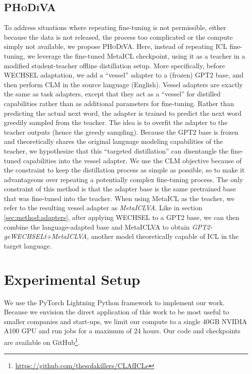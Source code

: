 \documentclass[11pt]{article}
\begin{document}
\subsection{\textsc{PHoDiVA}}

To address situations where repeating fine-tuning is not permissible, either because the data is not
released, the process too complicated or the compute simply not available, we propose
\textsc{PHoDiVA}. Here, instead of repeating ICL fine-tuning, we leverage the fine-tuned MetaICL
checkpoint, using it as a teacher in a modified student-teacher offline distillation
\citep{hinton_distilling_2015} setup. More specifically, before WECHSEL adaptation, we add
a ``vessel'' adapter to a (frozen) GPT2 base, and then perform CLM in the source language (English).
Vessel adapters are exactly the same as task adapters, except that they act as a ``vessel'' for
distilled capabilities rather than as additional parameters for fine-tuning. Rather than predicting
the actual next word, the adapter is trained to predict the next word greedily sampled from the
teacher. The idea is to overfit the adapter to the teacher outputs (hence the greedy sampling).
Because the GPT2 base is frozen and theoretically shares the original language modeling capabilities
of the teacher, we hypothesize that this ``targeted distillation'' can disentangle the fine-tuned
capabilities into the vessel adapter. We use the CLM objective because of the constraint to keep the
distillation process as simple as possible, so to make it advantageous over repeating a potentially
complex fine-tuning process. The only constraint of this method is that the adapter base is the same
pretrained base that was fine-tuned into the teacher. When using MetaICL as the teacher, we refer to
the resulting vessel adapter as \textit{MetaICLVA}. Like in section \ref{sec:method:adapters}, after
applying WECHSEL to a GPT2 base, we can then combine the language-adapted base and MetaICLVA to
obtain \textit{GPT2-geWECHSELt+MetaICLVA}, another model theoretically capable of ICL in the target
language.

\section{Experimental Setup}

We use the PyTorch Lightning Python framework \citep{falcon_pytorch_2019} to implement our work.
Because we envision the direct application of this work to be most useful to smaller companies and
start-ups, we limit our compute to a single 40GB NVIDIA A100 GPU and run jobs for a maximum of 24
hours. Our code and checkpoints are available on
GitHub\footnote{\href{https://github.com/thesofakillers/CLAfICLe}{https://github.com/thesofakillers/CLAfICLe}}.
\end{document}
